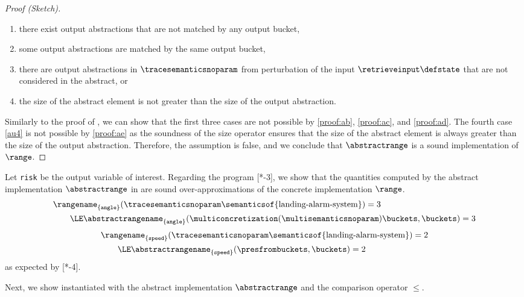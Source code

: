 \begin{proof}[Proof (Sketch)]
  \begin{enumerate}[label=(\alph*)]
    \item \label{au1} there exist output abstractions that are not matched by any output bucket,
    \item \label{au2} some output abstractions are matched by the same output bucket,
    \item \label{au3} there are output abstractions in $\tracesemanticsnoparam$ from perturbation of the input $\retrieveinput\defstate$ that are not considered in the abstract, or
    \item \label{au4} the size of the abstract element is not greater than the size of the output abstraction.
  \end{enumerate}
  Similarly to the proof of , we can show that the first three cases are not possible by \ref{proof:ab}, \ref{proof:ac}, and \ref{proof:ad}.
  The fourth case \ref{au4} is not possible by \ref{proof:ae} as the soundness of the size operator ensures that the size of the abstract element is always greater than the size of the output abstraction.
  Therefore, the assumption is false, and we conclude that $\abstractrange$ is a sound implementation of $\range$.
\end{proof}

\begin{example}
  Let \texttt{risk} be the output variable of interest.
  Regarding the program [*-3], we show that the quantities computed by the abstract implementation $\abstractrange$ in  are sound over-approximations of the concrete implementation $\range$.
  \begin{align*}
    & \rangename_{\{\texttt{angle}\}}(\tracesemanticsnoparam\semanticsof{\textup{landing-alarm-system}}) = 3 \\
    &\qquad\LE \abstractrangename_{\{\texttt{angle}\}}(\multiconcretization(\multisemanticsnoparam)\buckets, \buckets) = 3
  \end{align*}
  \begin{align*}
    & \rangename_{\{\texttt{speed}\}}(\tracesemanticsnoparam\semanticsof{\textup{landing-alarm-system}}) = 2 \\
    &\qquad\LE \abstractrangename_{\{\texttt{speed}\}}(\presfrombuckets, \buckets) = 2
  \end{align*}
  as expected by [*-4].
\end{example}

Next, we show  instantiated with the abstract implementation $\abstractrange$ and the comparison operator $\le$.

